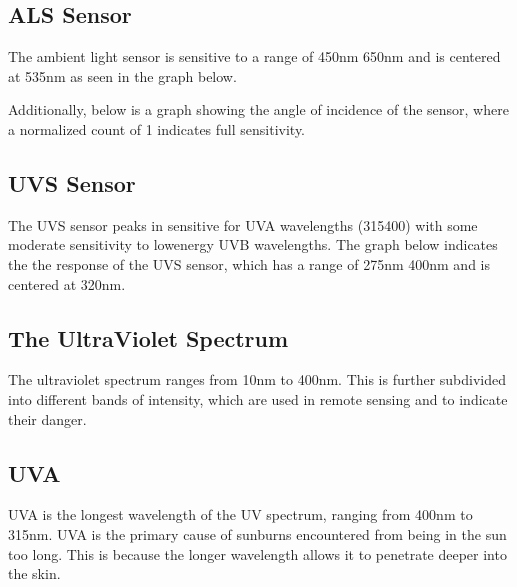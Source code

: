 \documentclass[letterpaper,10pt,english]{sphinxmanual}
\begin{document}
\subsection{ALS Sensor}
\label{\detokenize{sensors/ltr390:als-sensor}}
\sphinxAtStartPar
The ambient light sensor is sensitive to a range of 450nm \sphinxhyphen{} 650nm and is centered at 535nm as seen in the graph below.


\sphinxAtStartPar
Additionally, below is a graph showing the angle of incidence of the sensor, where a normalized count of 1 indicates full sensitivity.



\subsection{UVS Sensor}
\label{\detokenize{sensors/ltr390:uvs-sensor}}
\sphinxAtStartPar
The UVS sensor peaks in sensitive for UVA wavelengths (315\sphinxhyphen{}400) with some moderate sensitivity to low\sphinxhyphen{}energy UVB wavelengths. The graph below indicates the the response of the UVS sensor, which has a range of 275nm \sphinxhyphen{} 400nm and is centered at 320nm.



\subsection{The Ultra\sphinxhyphen{}Violet Spectrum}
\label{\detokenize{sensors/ltr390:the-ultra-violet-spectrum}}
\sphinxAtStartPar
The ultra\sphinxhyphen{}violet spectrum ranges from 10nm to 400nm. This is further subdivided into different bands of intensity, which are used in remote sensing and to indicate their danger.



\subsection{UVA}
\label{\detokenize{sensors/ltr390:uva}}
\sphinxAtStartPar
UVA is the longest wavelength of the UV spectrum, ranging from 400nm to 315nm. UVA is the primary cause of sunburns encountered from being in the sun too long. This is because the longer wavelength allows it to penetrate deeper into the skin.
\end{document}
